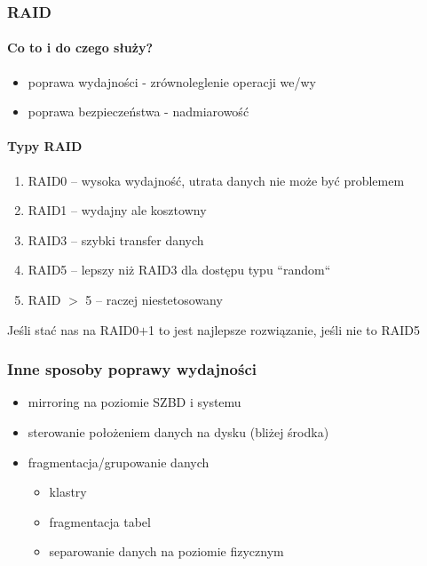 \documentclass[12pt]{article}
\begin{document}
\subsubsection{\ac{RAID}}
\paragraph{Co to i do czego służy?}
\begin{itemize}
\item poprawa wydajności - zrównoleglenie operacji we/wy
\item poprawa bezpieczeństwa - nadmiarowość
\end{itemize}

\paragraph{Typy \acs{RAID}}
\begin{enumerate}
\item \ac{RAID}0 -- wysoka wydajność, utrata danych nie może być problemem
\item \ac{RAID}1 -- wydajny ale kosztowny
\item \ac{RAID}3 -- szybki transfer danych
\item \ac{RAID}5 -- lepszy niż \ac{RAID}3 dla dostępu typu ``random``
\item \ac{RAID} $>$ 5 -- raczej niestetosowany
\end{enumerate}

Jeśli stać nas na \ac{RAID}0$+$1 to jest najlepsze rozwiązanie, jeśli nie to \ac{RAID}5

\subsubsection{Inne sposoby poprawy wydajności}
\begin{itemize}
\item mirroring na poziomie \ac{SZBD} i systemu
\item sterowanie położeniem danych na dysku (bliżej środka)
\item fragmentacja/grupowanie danych
\begin{itemize}
\item klastry
\item fragmentacja tabel
\item separowanie danych na poziomie fizycznym
\end{itemize}
\end{itemize}
\end{document}
